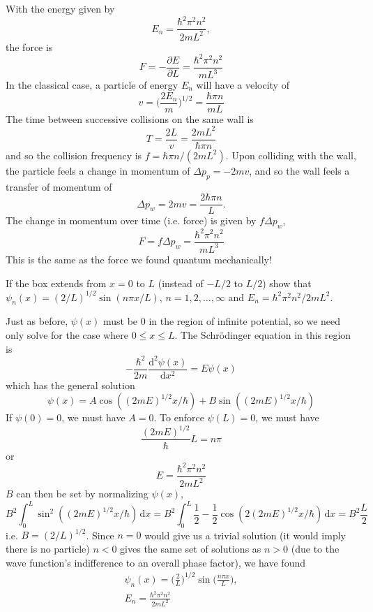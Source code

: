 \documentclass[../principles-of-quantum-mechanics.tex]{subfiles}
\begin{document}
\begin{questions}
	\begin{solution}
		With the energy given by
		$$E_n = \frac{\hbar^2\pi^2n^2}{2mL^2},$$
		the force is
		$$F = -\frac{\partial E}{\partial L} = \frac{\hbar^2\pi^2n^2}{mL^3}$$
		In the classical case, a particle of energy $E_n$ will have a velocity of
		$$v = \Big(\frac{2E_n}{m}\Big)^{1/2} = \frac{\hbar\pi n}{mL}$$
		The time between successive collisions on the same wall is
		$$T = \frac{2L}{v} = \frac{2mL^2}{\hbar\pi n}$$
		and so the collision frequency is $f = \hbar \pi n / (2mL^2)$. Upon colliding with the wall, the particle feels a change in momentum of $\Delta p_p = -2mv$, and so the wall feels a transfer of momentum of
		$$\Delta p_w = 2mv = \frac{2\hbar \pi n}{L}.$$
		The change in momentum over time (i.e. force) is given by $f\Delta p_w$,
		$$F = f\Delta p_w = \frac{\hbar^2\pi^2n^2}{mL^3}$$
		This is the same as the force we found quantum mechanically!
	\end{solution}
	
	\question If the box extends from $x = 0$ to $L$ (instead of $-L/2$ to $L/2$) show that $\psi_n(x) = (2/L)^{1/2}\sin(n\pi x/L)$, $n=1, 2, \ldots, \infty$ and $E_n = \hbar^2\pi^2 n^2/2mL^2$.
	
	\begin{solution}
		Just as before, $\psi(x)$ must be $0$ in the region of infinite potential, so we need only solve for the case where $0 \leq x \leq L$. The Schr\"odinger equation in this region is 
		$$-\frac{\hbar^2}{2m}\frac{\mathrm{d}^2\psi(x)}{\mathrm{d}x^2} = E\psi(x)$$
		which has the general solution
		$$\psi(x) = A\cos((2mE)^{1/2}x/\hbar) + B\sin((2mE)^{1/2}x/\hbar)$$
		If $\psi(0) = 0$, we must have $A = 0$. To enforce $\psi(L) = 0$, we must have
		$$\frac{(2mE)^{1/2}}{\hbar}L = n\pi$$
		or 
		$$E = \frac{\hbar^2\pi^2 n^2}{2mL^2}$$
		$B$ can then be set by normalizing $\psi(x)$,
		$$B^2\int_0^L\sin^2((2mE)^{1/2}x/\hbar)\,\mathrm{d}x = B^2\int_0^L\frac{1}{2} - \frac{1}{2}\cos(2(2mE)^{1/2}x/\hbar)\,\mathrm{d}x = B^2\frac{L}{2}$$
		i.e. $B = (2/L)^{1/2}$. Since $n = 0$ would give us a trivial solution (it would imply there is no particle) $n < 0$ gives the same set of solutions as $n > 0$ (due to the wave function's indifference to an overall phase factor), we have found
		\begin{gather*}
			\psi_n(x) = \Big(\frac{2}{L}\Big)^{1/2}\sin\Big(\frac{n\pi x}{L}\Big), \\
			E_n = \frac{\hbar^2\pi^2 n^2}{2mL^2}
		\end{gather*}
	\end{solution}
	

\end{questions}
\end{document}
